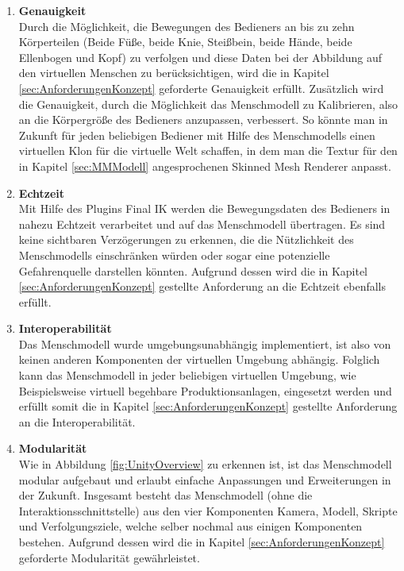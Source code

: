 \begin{enumerate}
	\item \textbf{Genauigkeit} \\
	Durch die Möglichkeit, die Bewegungen des Bedieners an bis zu zehn Körperteilen (Beide Füße, beide Knie, Steißbein, beide Hände, beide Ellenbogen und Kopf) zu verfolgen und diese Daten bei der Abbildung auf den virtuellen Menschen zu berücksichtigen, wird die in Kapitel \ref{sec:AnforderungenKonzept} geforderte Genauigkeit erfüllt. Zusätzlich wird die Genauigkeit, durch die Möglichkeit das Menschmodell zu Kalibrieren, also an die Körpergröße des Bedieners anzupassen, verbessert. So könnte man in Zukunft für jeden beliebigen Bediener mit Hilfe des Menschmodells einen virtuellen Klon für die virtuelle Welt schaffen, in dem man die Textur für den in Kapitel \ref{sec:MMModell} angesprochenen Skinned Mesh Renderer anpasst.
	\item \textbf{Echtzeit} \\
	Mit Hilfe des Plugins Final IK werden die Bewegungsdaten des Bedieners in nahezu Echtzeit verarbeitet und auf das Menschmodell übertragen. Es sind keine sichtbaren Verzögerungen zu erkennen, die die Nützlichkeit des Menschmodells einschränken würden oder sogar eine potenzielle Gefahrenquelle darstellen könnten. Aufgrund dessen wird die in Kapitel \ref{sec:AnforderungenKonzept} gestellte Anforderung an die Echtzeit ebenfalls erfüllt.
	\item \textbf{Interoperabilität} \\
	Das Menschmodell wurde umgebungsunabhängig implementiert, ist also von keinen anderen Komponenten der virtuellen Umgebung abhängig. Folglich kann das Menschmodell in jeder beliebigen virtuellen Umgebung, wie Beispielsweise virtuell begehbare Produktionsanlagen, eingesetzt werden und erfüllt somit die in Kapitel \ref{sec:AnforderungenKonzept} gestellte Anforderung an die Interoperabilität.
	\item \textbf{Modularität} \\
	Wie in Abbildung \ref{fig:UnityOverview} zu erkennen ist, ist das Menschmodell modular aufgebaut und erlaubt einfache Anpassungen und Erweiterungen in der Zukunft. Insgesamt besteht das Menschmodell (ohne die Interaktionsschnittstelle) aus den vier Komponenten Kamera, Modell, Skripte und Verfolgungsziele, welche selber nochmal aus einigen Komponenten bestehen. Aufgrund dessen wird die in Kapitel \ref{sec:AnforderungenKonzept} geforderte Modularität gewährleistet.
\end{enumerate}

